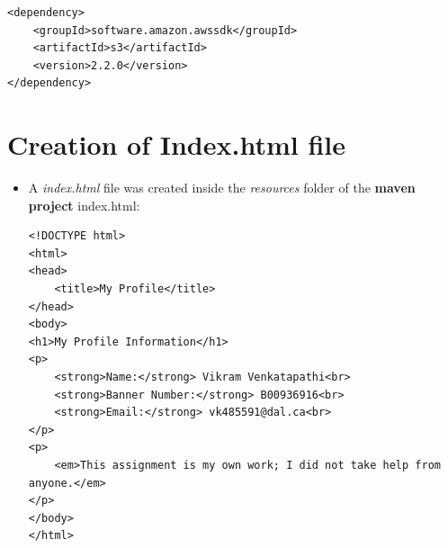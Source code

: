 \begin{itemize}
\begin{itemize}
                \begin{lstlisting}
<dependency>
    <groupId>software.amazon.awssdk</groupId>
    <artifactId>s3</artifactId>
    <version>2.2.0</version>
</dependency>
\end{lstlisting}

        \end{itemize}

\end{itemize}
\newpage
\section{Creation of Index.html file}
\begin{itemize}
  \item A \textit{index.html} file was created inside the \textit{resources }folder of the \textbf{maven project}
        \newline\newline
        index.html:

        \begin{lstlisting}
<!DOCTYPE html>
<html>
<head>
    <title>My Profile</title>
</head>
<body>
<h1>My Profile Information</h1>
<p>
    <strong>Name:</strong> Vikram Venkatapathi<br>
    <strong>Banner Number:</strong> B00936916<br>
    <strong>Email:</strong> vk485591@dal.ca<br>
</p>
<p>
    <em>This assignment is my own work; I did not take help from anyone.</em>
</p>
</body>
</html>
\end{lstlisting}
\end{itemize}

